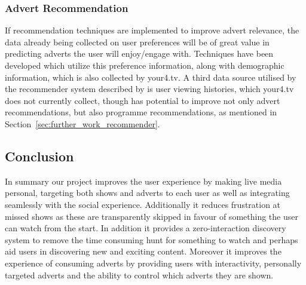 	\subsubsection{Advert Recommendation}

	If recommendation techniques are implemented to improve advert relevance, the data already being collected on user preferences will be of great value in predicting adverts the user will enjoy/engage with. Techniques have been developed \cite{contextual_advertising} which utilize this preference information, along with demographic \cite{contextual_advertising} information, which is also collected by your4.tv. A third data source utilised by the recommender system described by \cite{contextual_advertising} is user viewing histories, which your4.tv does not currently collect, though has potential to improve not only advert recommendations, but also programme recommendations, as mentioned in Section~\ref{sec:further_work_recommender}.

	\subsection{Conclusion}
In summary our project improves the user experience by making live media personal, targeting both shows and adverts to each user as well as integrating seamlessly with the social experience. Additionally it reduces frustration at missed shows as these are transparently skipped in favour of something the user can watch from the start. In addition it provides a zero-interaction discovery system to remove the time consuming hunt for something to watch and perhaps aid users in discovering new and exciting content. Moreover it improves the experience of consuming adverts by providing users with interactivity, personally targeted adverts and the ability to control which adverts they are shown. 